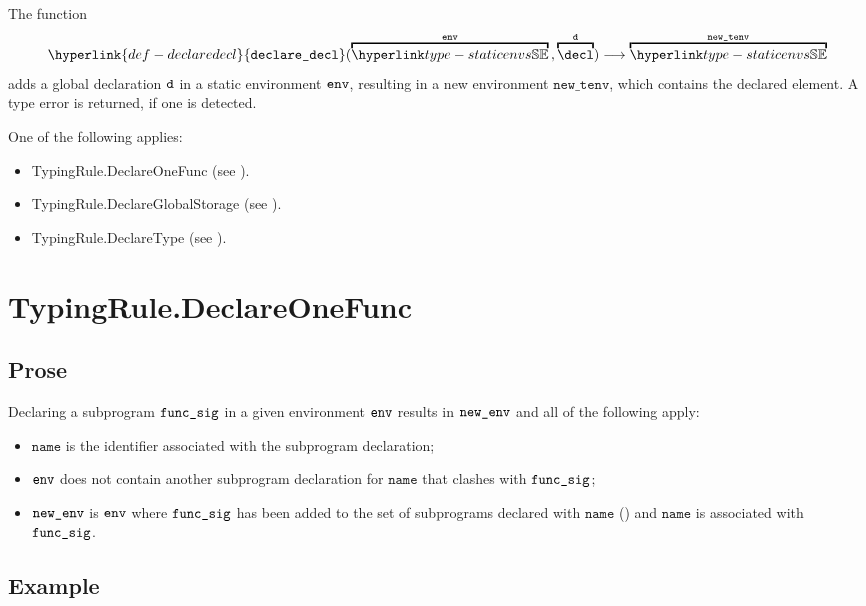 \documentclass{book}
\newcommand\declaredecl[1]{\hyperlink{def-declaredecl}{\texttt{declare\_decl}}(#1)}
\newcommand\newtenv[0]{\texttt{new\_tenv}}
\newcommand\name[0]{\texttt{name}}
\begin{document}
The function
\[
  \declaredecl{\overname{\staticenvs}{\tenv} \aslsep \overname{\decl}{\vd}}
  \aslto \overname{\staticenvs}{\newtenv}
\]
adds a global declaration $\texttt{d}$ in a static environment $\texttt{env}$,
resulting in a new environment $\newtenv$, which contains the declared element.
A type error is returned, if one is detected.

One of the following applies:
\begin{itemize}
  \item TypingRule.DeclareOneFunc (see ).
  \item TypingRule.DeclareGlobalStorage (see ).
  \item TypingRule.DeclareType (see ).
\end{itemize}

\section{TypingRule.DeclareOneFunc \label{sec:TypingRule.DeclareOneFunc}}
\subsection{Prose}
Declaring a subprogram $\texttt{func\_sig}$ in a given environment $\texttt{env}$ results
in $\texttt{new\_env}$ and all of the following apply:
\begin{itemize}
  \item $\name$ is the identifier associated with the subprogram declaration;
  \item $\texttt{env}$ does not contain another subprogram declaration for $\name$ that clashes with $\texttt{func\_sig}$;
  \item $\texttt{new\_env}$ is $\texttt{env}$ where
  $\texttt{func\_sig}$ has been added to the set of subprograms declared with $\name$ (\subprogramrenamings)
  and $\name$ is associated with $\texttt{func\_sig}$.
\end{itemize}

\subsection{Example}
\end{document}
